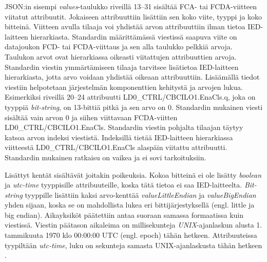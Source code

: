 JSON:in sisempi \emph{values}-taulukko riveillä 13--31 sisältää FCA- tai FCDA-viitteen viitatut attribuutit. Jokaiseen attribuuttiin lisättiin sen koko viite, tyyppi ja koko bitteinä. Viitteen avulla tilaaja voi yhdistää arvon attribuuttiin ilman tietoa IED-laitteen hierarkiasta. Standardin määrittämässä viestissä saapuva viite on datajoukon FCD- tai FCDA-viittaus ja sen alla taulukko pelkkiä arvoja. Taulukon arvot ovat hierarkiassa oikeasti viitattujen attribuuttien arvoja. Standardin viestin ymmärtämiseen tilaaja tarvitsee lisätietoa IED-laitteen hierarkiasta, jotta arvo voidaan yhdistää oikeaan attribuuttiin. Lisäämällä tiedot viestiin helpotetaan järjestelmän komponenttien kehitystä ja arvojen lukua. Esimerkiksi riveillä 20--24 attribuutti LD0\_CTRL/CBCILO1.EnaCls.q, joka on tyyppiä \emph{bit-string}, on 13-bittiä pitkä ja sen arvo on 0. Standardin mukainen viesti sisältää vain arvon 0 ja siihen viittavaan FCDA-viitten LD0\_CTRL/CBCILO1.EnaCls. Standardin viestin pohjalta tilaajan täytyy katsoa arvon indeksi viestistä. Indeksillä tietää IED-laitteen hierarkiassa viitteestä LD0\_CTRL/CBCILO1.EnaCls alaspäin viitattu attribuutti. Standardin mukainen ratkaisu on vaikea ja ei sovi tarkoituksiin.

Lisättyt kentät sisältävät joitakin poikeuksia. Kokoa bitteinä ei ole lisätty \emph{boolean} ja \emph{utc-time} tyyppisille attribuuteille, koska tätä tietoa ei saa IED-laitteelta. \emph{Bit-string} tyyppille lisättiin kaksi arvo-kenttää \emph{valueLittleEndian} ja \emph{valueBigEndian} yhden sijaan, koska se on mahdollista lukea eri bittijärjestyksellä (engl. little ja big endian). Aikayksiköt päätettiin antaa suoraan samassa formaatissa kuin viestissä. Viestin päätason aikaleima on millisekunteja \emph{UNIX}-ajanlaskun alusta 1. tammikuuta 1970 klo 00:00:00 UTC (engl. epoch) tähän hetkeen. Attribuuteissa tyypiltään \emph{utc-time}, luku on sekunteja samasta UNIX-ajanlaskusta tähän hetkeen \mbox{\cite[s.~26--27]{IEC61850-7-2}}.